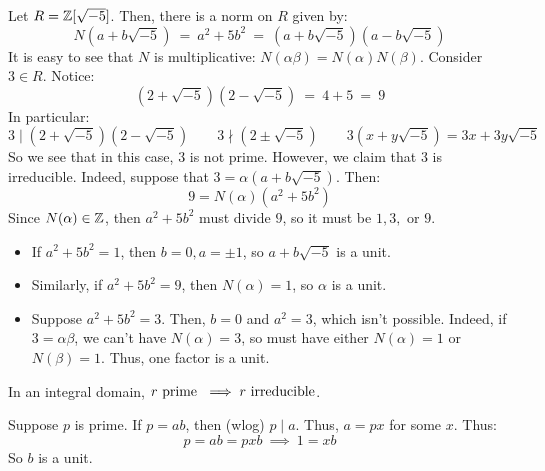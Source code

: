 \begin{xmp}[source=Primary Source Material]
    Let $ R = \mathbb{Z}[\sqrt{-5}] $. Then, there is a norm on $ R $ given by:
    \begin{equation*}
        N(a+b\sqrt{-5}) \ = \ a^{2}+5b^{2} \ = \ (a+b\sqrt{-5})(a-b\sqrt{-5})
    \end{equation*}
    It is easy to see that $ N $ is multiplicative: $ N(\alpha\beta) = N(\alpha)N(\beta) $. \vsp
    Consider $ 3 \in R $. Notice:
    \begin{equation*}
        (2+\sqrt{-5})(2-\sqrt{-5}) \ = \ 4+5 \ = \ 9
    \end{equation*}
    In particular:
    \begin{equation*}
        3 \mid (2+\sqrt{-5})(2-\sqrt{-5}) \qquad
        3 \nmid (2 \pm \sqrt{-5}) \qquad
        3(x+y\sqrt{-5}) = 3x + 3y\sqrt{-5}
    \end{equation*}
    So we see that in this case, $ 3 $ is not prime.
    However, we claim that $ 3 $ is irreducible. \vsp
    Indeed, suppose that $ 3=\alpha(a+b\sqrt{-5}) $. Then:
    \begin{equation*}
        9 = N(\alpha)(a^{2}+5b^{2})
    \end{equation*}
    Since $ N(\alpha) \in \mathbb{Z} $, then $ a^{2}+5b^{2} $ must divide $ 9 $, so it must be
    $ 1, 3, $ or $ 9 $.
    \begin{itemize}
        \item If $ a^{2}+5b^{2} = 1 $, then $ b=0, a= \pm1 $, so $ a+b\sqrt{-5} $ is a unit.
        \item Similarly, if $ a^{2}+5b^{2}=9 $, then $ N(\alpha) = 1 $, so $ \alpha $ is a unit.
        \item Suppose $ a^{2}+5b^{2} = 3 $. Then, $ b=0 $ and $ a^{2}=3 $, which isn't possible.
            Indeed, if $ 3=\alpha\beta $, we can't have $ N(\alpha) = 3 $, so must have either
            $ N(\alpha)=1 $ or $ N(\beta)=1 $. Thus, one factor is a unit.
    \end{itemize}
\end{xmp}

\begin{thm}
    In an integral domain, $ r \textrm{ prime } \implies r \textrm{ irreducible} $.
\end{thm}

\begin{pf}[source=Primary Source Material]
    Suppose $ p $ is prime. If $ p=ab $, then (wlog) $ p\mid a $. Thus, $ a=px $ for some $ x $.
    Thus:
    \begin{equation*}
        p=ab=pxb\ \implies \ 1=xb
    \end{equation*}
    So $ b $ is a unit.
\end{pf}

